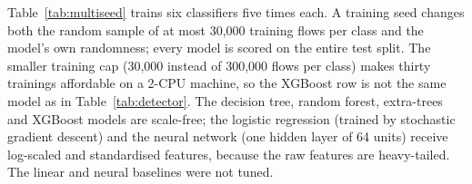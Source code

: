 \documentclass[preprint,12pt]{elsarticle}
\begin{document}
Table~\ref{tab:multiseed} trains six classifiers five times each. A training seed changes both the random sample of at most 30,000 training flows per class and the model's own randomness; every model is scored on the entire test split. The smaller training cap (30,000 instead of 300,000 flows per class) makes thirty trainings affordable on a 2-CPU machine, so the XGBoost row is not the same model as in Table~\ref{tab:detector}. The decision tree, random forest, extra-trees and XGBoost models are scale-free; the logistic regression (trained by stochastic gradient descent) and the neural network (one hidden layer of 64 units) receive log-scaled and standardised features, because the raw features are heavy-tailed. The linear and neural baselines were not tuned.

\begin{table}[htbp]
\centering
\caption{Six classifiers on the full test split: mean $\pm$ sample standard deviation over training seeds. Each model is trained on at most 30,000 flows per class.}
\label{tab:multiseed}
\footnotesize
{}
\end{table}
\end{document}
